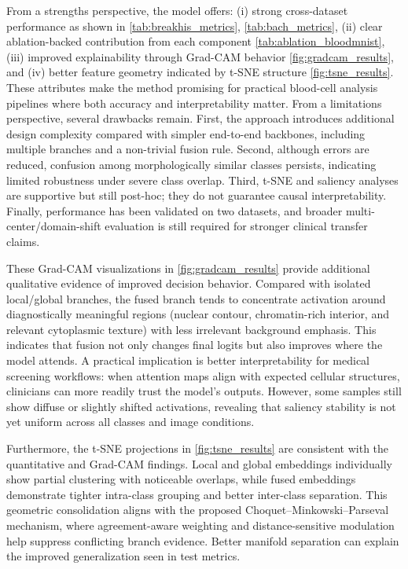 \documentclass[12pt]{article}
\begin{document}
From a strengths perspective, the model offers: (i) strong cross-dataset performance as shown in \autoref{tab:breakhis_metrics}, \autoref{tab:bach_metrics}, (ii) clear ablation-backed contribution from each component \autoref{tab:ablation_bloodmnist}, (iii) improved explainability through Grad-CAM behavior \autoref{fig:gradcam_results}, and (iv) better feature geometry indicated by t-SNE structure \autoref{fig:tsne_results}. These attributes make the method promising for practical blood-cell analysis pipelines where both accuracy and interpretability matter. From a limitations perspective, several drawbacks remain. First, the approach introduces additional design complexity compared with simpler end-to-end backbones, including multiple branches and a non-trivial fusion rule. Second, although errors are reduced, confusion among morphologically similar classes persists, indicating limited robustness under severe class overlap. Third, t-SNE and saliency analyses are supportive but still post-hoc; they do not guarantee causal interpretability. Finally, performance has been validated on two datasets, and broader multi-center/domain-shift evaluation is still required for stronger clinical transfer claims.

These Grad-CAM visualizations in \autoref{fig:gradcam_results} provide additional qualitative evidence of improved decision behavior. Compared with isolated local/global branches, the fused branch tends to concentrate activation around diagnostically meaningful regions (nuclear contour, chromatin-rich interior, and relevant cytoplasmic texture) with less irrelevant background emphasis. This indicates that fusion not only changes final logits but also improves where the model attends. A practical implication is better interpretability for medical screening workflows: when attention maps align with expected cellular structures, clinicians can more readily trust the model’s outputs. However, some samples still show diffuse or slightly shifted activations, revealing that saliency stability is not yet uniform across all classes and image conditions.

Furthermore, the t-SNE projections in \autoref{fig:tsne_results} are consistent with the quantitative and Grad-CAM findings. Local and global embeddings individually show partial clustering with noticeable overlaps, while fused embeddings demonstrate tighter intra-class grouping and better inter-class separation. This geometric consolidation aligns with the proposed Choquet--Minkowski--Parseval mechanism, where agreement-aware weighting and distance-sensitive modulation help suppress conflicting branch evidence. Better manifold separation can explain the improved generalization seen in test metrics. 
\end{document}
